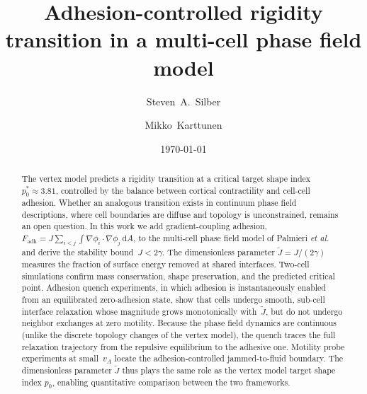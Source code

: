 \documentclass[aps,pre,twocolumn,superscriptaddress,longbibliography,floatfix]{revtex4-2}
\newcommand{\dd}{\mathrm{d}}               %
\newcommand{\vA}{v_{\!A}}                  %
\newcommand{\Jt}{\tilde{J}}               %
\newcommand{\phii}{\phi_i}                 %
\newcommand{\phij}{\phi_j}                 %
\begin{document}
\title{Adhesion-controlled rigidity transition in a multi-cell phase field model}

\author{Steven~A.~Silber}

\author{Mikko~Karttunen}

\date{\today}

\begin{abstract}
The vertex model predicts a rigidity transition at a critical target shape index
$p_0^*\!\approx 3.81$, controlled by the balance between cortical contractility
and cell-cell adhesion.  Whether an analogous transition exists in continuum
phase field descriptions, where cell boundaries are diffuse and topology is
unconstrained, remains an open question.  In this work we add gradient-coupling
adhesion,
$F_{\mathrm{adh}} = J\sum_{i<j}\!\int\!\nabla\phii\cdot\nabla\phij\,\dd A$,
to the multi-cell phase field model of Palmieri
\textit{et al.}~\cite{Palmieri2015} and derive the
stability bound~$J < 2\gamma$.  The dimensionless parameter
$\Jt = J/(2\gamma)$ measures the fraction of surface energy removed at shared
interfaces.  Two-cell simulations confirm mass conservation, shape
preservation, and the predicted critical point.  Adhesion quench
experiments, in which adhesion is instantaneously enabled from an equilibrated
zero-adhesion state, show that cells undergo smooth, sub-cell interface
relaxation whose magnitude grows monotonically with~$\Jt$, but do not
undergo neighbor exchanges at zero motility.  Because the phase field
dynamics are continuous (unlike the discrete topology changes of the
vertex model), the quench traces the full relaxation trajectory from the
repulsive equilibrium to the adhesive one.  Motility probe experiments at
small~$\vA$ locate the adhesion-controlled jammed-to-fluid boundary.
The dimensionless parameter $\Jt$ thus plays the same role as the vertex
model target shape index $p_0$, enabling quantitative comparison
between the two frameworks.
\end{abstract}
\end{document}
